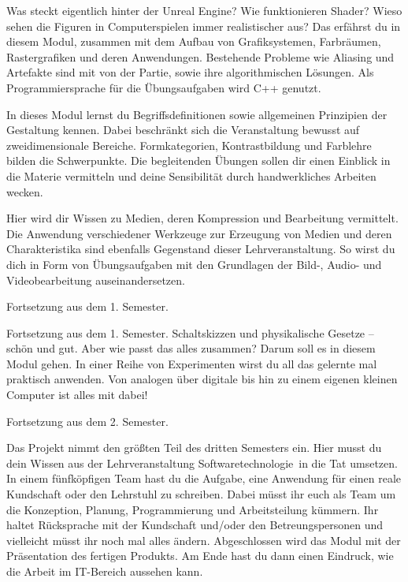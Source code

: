 Was steckt eigentlich hinter der Unreal Engine? Wie funktionieren Shader?
Wieso sehen die Figuren in Computerspielen immer realistischer aus?
Das erfährst du in diesem Modul, zusammen mit dem Aufbau von Grafiksystemen, Farbräumen, Rastergrafiken und deren Anwendungen.
Bestehende Probleme wie Aliasing und Artefakte sind mit von der Partie, sowie ihre algorithmischen Lösungen.
Als Programmiersprache für die Übungsaufgaben wird C++ genutzt.

In dieses Modul lernst du Begriffsdefinitionen sowie allgemeinen Prinzipien der Gestaltung kennen.
Dabei beschränkt sich die Veranstaltung bewusst auf zweidimensionale Bereiche.
Formkategorien, Kontrastbildung und Farblehre bilden die Schwerpunkte.
Die begleitenden Übungen sollen dir einen Einblick in die Materie vermitteln und deine Sensibilität durch handwerkliches Arbeiten wecken.

Hier wird dir Wissen zu Medien, deren Kompression und Bearbeitung vermittelt.
Die Anwendung verschiedener Werkzeuge zur Erzeugung von Medien und deren Charakteristika sind ebenfalls Gegenstand dieser Lehrveranstaltung.
So wirst du dich in Form von Übungsaufgaben mit den Grundlagen der Bild-, Audio- und Videobearbeitung auseinandersetzen.

Fortsetzung aus dem 1. Semester.

Fortsetzung aus dem 1. Semester. Schaltskizzen und physikalische Gesetze -- schön und gut. Aber wie passt das alles zusammen?
Darum soll es in diesem Modul gehen. In einer Reihe von Experimenten wirst du all das gelernte mal praktisch anwenden.
Von analogen über digitale bis hin zu einem eigenen kleinen Computer ist alles mit dabei!

\newpage


Fortsetzung aus dem 2. Semester.

Das Projekt nimmt den größten Teil des dritten Semesters ein.
Hier musst du dein Wissen aus der Lehrveranstaltung \glqq Softwaretechnologie\grqq\ in die Tat umsetzen.
In einem fünfköpfigen Team hast du die Aufgabe, eine Anwendung für einen reale Kundschaft oder den Lehrstuhl zu schreiben.
Dabei müsst ihr euch als Team um die Konzeption, Planung, Programmierung und Arbeitsteilung kümmern.
Ihr haltet Rücksprache mit der Kundschaft und/oder den Betreungspersonen und vielleicht müsst ihr noch mal alles ändern.
Abgeschlossen wird das Modul mit der Präsentation des fertigen Produkts.
Am Ende hast du dann einen Eindruck, wie die Arbeit im IT-Bereich aussehen kann.

